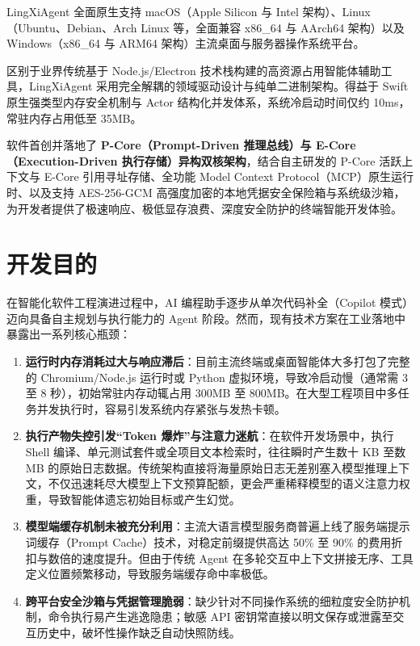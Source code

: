 \documentclass[11pt,a4paper]{article}
\begin{document}
LingXiAgent 全面原生支持 macOS（Apple Silicon 与 Intel 架构）、Linux（Ubuntu、Debian、Arch Linux 等，全面兼容 x86\_64 与 AArch64 架构）以及 Windows（x86\_64 与 ARM64 架构）主流桌面与服务器操作系统平台。

区别于业界传统基于 Node.js/Electron 技术栈构建的高资源占用智能体辅助工具，LingXiAgent 采用完全解耦的领域驱动设计与纯单二进制架构。得益于 Swift 原生强类型内存安全机制与 Actor 结构化并发体系，系统冷启动时间仅约 10ms，常驻内存占用低至 35MB。

软件首创并落地了 \textbf{P-Core（Prompt-Driven 推理总线）与 E-Core（Execution-Driven 执行存储）异构双核架构}，结合自主研发的 P-Core 活跃上下文与 E-Core 引用寻址存储、全功能 Model Context Protocol（MCP）原生运行时、以及支持 AES-256-GCM 高强度加密的本地凭据安全保险箱与系统级沙箱，为开发者提供了极速响应、极低显存浪费、深度安全防护的终端智能开发体验。

\section{开发目的}

在智能化软件工程演进过程中，AI 编程助手逐步从单次代码补全（Copilot 模式）迈向具备自主规划与执行能力的 Agent 阶段。然而，现有技术方案在工业落地中暴露出一系列核心瓶颈：

\begin{enumerate}
    \item \textbf{运行时内存消耗过大与响应滞后}：目前主流终端或桌面智能体大多打包了完整的 Chromium/Node.js 运行时或 Python 虚拟环境，导致冷启动慢（通常需 3 至 8 秒），初始常驻内存动辄占用 300MB 至 800MB。在大型工程项目中多任务并发执行时，容易引发系统内存紧张与发热卡顿。
    \item \textbf{执行产物失控引发“Token 爆炸”与注意力迷航}：在软件开发场景中，执行 Shell 编译、单元测试套件或全项目文本检索时，往往瞬时产生数十 KB 至数 MB 的原始日志数据。传统架构直接将海量原始日志无差别塞入模型推理上下文，不仅迅速耗尽大模型上下文预算配额，更会严重稀释模型的语义注意力权重，导致智能体遗忘初始目标或产生幻觉。
    \item \textbf{模型端缓存机制未被充分利用}：主流大语言模型服务商普遍上线了服务端提示词缓存（Prompt Cache）技术，对稳定前缀提供高达 50\% 至 90\% 的费用折扣与数倍的速度提升。但由于传统 Agent 在多轮交互中上下文拼接无序、工具定义位置频繁移动，导致服务端缓存命中率极低。
    \item \textbf{跨平台安全沙箱与凭据管理脆弱}：缺少针对不同操作系统的细粒度安全防护机制，命令执行易产生逃逸隐患；敏感 API 密钥常直接以明文保存或泄露至交互历史中，破坏性操作缺乏自动快照防线。
\end{enumerate}
\end{document}

